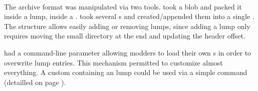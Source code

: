 \par
{}
\par
{}\\
\par
{}
\par
The archive format was manipulated via two tools.  took a blob and packed it inside a lump, inside a .  took several s and created/appended them into a single . The structure allows easily adding or removing lumps, since adding a lump only requires moving the small directory at the end and updating the header offset.\\
\par
{} had a command-line parameter allowing modders to load their own s in order to overwrite  lump entries. This mechanism permitted to customize almost everything. A custom  containing an  lump could be used via a simple  command (detailled on page \pageref{wad_detailled}).




